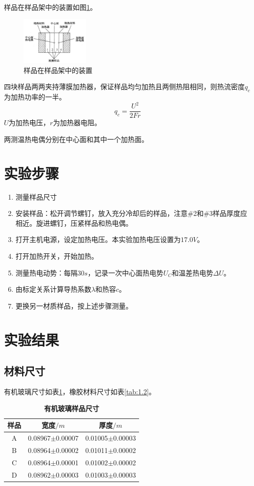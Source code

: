 \documentclass[10pt,a4paper,twocolumn,twoside,UTF8]{ctexart}
\begin{document}
	样品在样品架中的装置如图\ref{fig:illus-4}。
	\begin{figure}[htbp]
        \centering
        \includegraphics[width=0.3\textwidth]{attachments/illus-4.png}
        \caption{样品在样品架中的装置}
        \label{fig:illus-4}
    \end{figure}
	四块样品两两夹持薄膜加热器，保证样品均匀加热且两侧热阻相同，则热流密度$q_c$为加热功率的一半。
	\begin{equation}
		q_c = \frac{U^2}{2Fr}	\label{eq:3}
	\end{equation}
	$U$为加热电压，$r$为加热器电阻。
	
	两测温热电偶分别在中心面和其中一个加热面。

\section{实验步骤}
	\begin{enumerate}[label=\arabic*.]
		\item 测量样品尺寸
		\item 安装样品：松开调节螺钉，放入充分冷却后的样品，注意\#2和\#3样品厚度应相近。旋进螺钉，压紧样品和热电偶。
		\item 打开主机电源，设定加热电压。本实验加热电压设置为$17.0V$。
		\item 打开加热开关，开始加热。
		\item 测量热电动势：每隔$30s$，记录一次中心面热电势$U_C$和温差热电势$\Delta U$。
		\item 由标定关系计算导热系数$\lambda$和热容$c$。
		\item 更换另一材质样品，按上述步骤测量。
	\end{enumerate}

\section{实验结果}
	\subsection{材料尺寸}
	有机玻璃尺寸如表\ref{tab:1.1}，橡胶材料尺寸如表\ref{tab:1.2}。
	\begin{table}[htbp]
    	\centering
    		\begin{tabular}{ccc}
				\toprule
				样品	&宽度$/m$ &厚度$/m$ \\
				\midrule
				A	&0.08967$\pm$0.00007	&0.01005$\pm$0.00003	\\
				B	&0.08964$\pm$0.00002	&0.01011$\pm$0.00002	\\
				C	&0.08964$\pm$0.00001	&0.01002$\pm$0.00002	\\
				D	&0.08962$\pm$0.00003	&0.01003$\pm$0.00003	\\
				\bottomrule
			\end{tabular}
			\caption{\textbf{有机玻璃样品尺寸}}
			\label{tab:1.1}
    \end{table}
			
\end{document}
